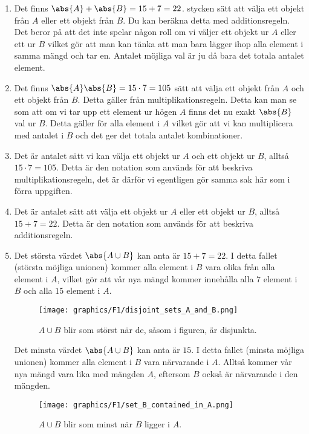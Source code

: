 \documentclass[nobib]{tufte-handout}
\begin{document}
\begin{solution}
	\begin{enumerate}
		\item Det finns $\abs{A} + \abs{B} = 15 + 7 = 22$. stycken sätt att välja ett objekt från $A$ eller ett objekt från $B$. Du kan beräkna detta med additionsregeln. Det beror på att det inte spelar någon roll om vi väljer ett objekt ur $A$ eller ett ur $B$ vilket gör att man kan tänka att man bara lägger ihop alla element i samma mängd och tar en. Antalet möjliga val är ju då bara det totala antalet element.

		\item Det finns $\abs{A}\abs{B}  = 15 \cdot 7= 105$ sätt att välja ett objekt från $A$ och ett objekt från $B$. Detta gäller från multiplikationsregeln. Detta kan man se som att om vi tar upp ett element ur högen $A$ finns det nu exakt $\abs{B}$ val ur $B$. Detta gäller för alla element i $A$ vilket gör att vi kan multiplicera med antalet i $B$ och det ger det totala antalet kombinationer.

		\item Det är antalet sätt vi kan välja ett objekt ur $A$ och ett objekt ur $B$, alltså $15 \cdot 7=105$. Detta är den notation som används för att beskriva multiplikationsregeln, det är därför vi egentligen gör samma sak här som i förra uppgiften.

		\item Det är antalet sätt att välja ett objekt ur $A$ eller ett objekt ur $B$, alltså $15 + 7 = 22$. Detta är den notation som används för att beskriva additionsregeln.

		\item Det största värdet $\abs{A \cup B}$ kan anta är $15+7=22$. I detta fallet (största möjliga unionen) kommer alla element i $B$ vara olika från alla element i $A$, vilket gör att vår nya mängd kommer innehålla alla $7$ element i $B$ och alla $15$ element i $A$. 
		\begin{figure}
			\centering
			\texttt{[image: graphics/F1/disjoint\_sets\_A\_and\_B.png]}
			\caption{$A \cup B$ blir som störst när de, såsom i figuren, är disjunkta.}
			\label{fig:A_and_B_disjoint}
		\end{figure}
		
		Det minsta värdet $\abs{A \cup B}$ kan anta är $15$. I detta fallet (minsta möjliga unionen) kommer alla element i $B$ vara närvarande i $A$. Alltså kommer vår nya mängd vara lika med mängden $A$, eftersom $B$ också är närvarande i den mängden. 
		\begin{figure}
			\centering
			\texttt{[image: graphics/F1/set\_B\_contained\_in\_A.png]}
			\caption{$A\cup B$ blir som minst när $B$ ligger i $A$.}
			\label{fig:B_contained_in_A}
		\end{figure}


\end{enumerate}
\end{solution}
\end{document}

